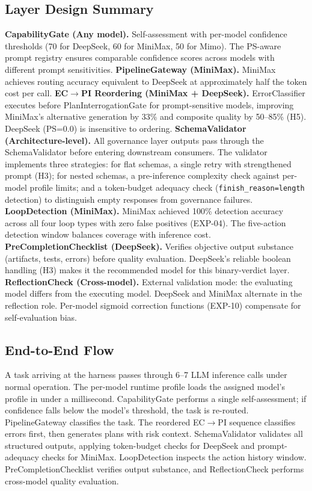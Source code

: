 \documentclass[11pt,a4paper]{article}
\begin{document}
\subsection{Layer Design Summary}

\textbf{CapabilityGate (Any model).} Self-assessment with per-model confidence thresholds (70 for DeepSeek, 60 for MiniMax, 50 for Mimo). The PS-aware prompt registry ensures comparable confidence scores across models with different prompt sensitivities. \textbf{PipelineGateway (MiniMax).} MiniMax achieves routing accuracy equivalent to DeepSeek at approximately half the token cost per call. \textbf{EC$\rightarrow$PI Reordering (MiniMax + DeepSeek).} ErrorClassifier executes before PlanInterrogationGate for prompt-sensitive models, improving MiniMax's alternative generation by 33\% and composite quality by 50--85\% (H5). DeepSeek (PS=0.0) is insensitive to ordering. \textbf{SchemaValidator (Architecture-level).} All governance layer outputs pass through the SchemaValidator before entering downstream consumers. The validator implements three strategies: for flat schemas, a single retry with strengthened prompt (H3); for nested schemas, a pre-inference complexity check against per-model profile limits; and a token-budget adequacy check (\texttt{finish\_reason=length} detection) to distinguish empty responses from governance failures. \textbf{LoopDetection (MiniMax).} MiniMax achieved 100\% detection accuracy across all four loop types with zero false positives (EXP-04). The five-action detection window balances coverage with inference cost. \textbf{PreCompletionChecklist (DeepSeek).} Verifies objective output substance (artifacts, tests, errors) before quality evaluation. DeepSeek's reliable boolean handling (H3) makes it the recommended model for this binary-verdict layer. \textbf{ReflectionCheck (Cross-model).} External validation mode: the evaluating model differs from the executing model. DeepSeek and MiniMax alternate in the reflection role. Per-model sigmoid correction functions (EXP-10) compensate for self-evaluation bias.

\subsection{End-to-End Flow}

A task arriving at the harness passes through 6--7 LLM inference calls under normal operation. The per-model runtime profile loads the assigned model's profile in under a millisecond. CapabilityGate performs a single self-assessment; if confidence falls below the model's threshold, the task is re-routed. PipelineGateway classifies the task. The reordered EC$\rightarrow$PI sequence classifies errors first, then generates plans with risk context. SchemaValidator validates all structured outputs, applying token-budget checks for DeepSeek and prompt-adequacy checks for MiniMax. LoopDetection inspects the action history window. PreCompletionChecklist verifies output substance, and ReflectionCheck performs cross-model quality evaluation.
\end{document}
